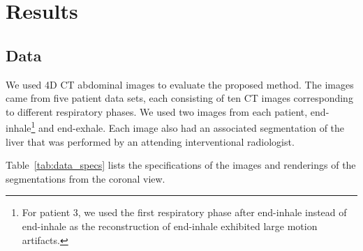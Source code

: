 \documentclass[]{spie}  %
\begin{document}
\section{Results}

\subsection{Data}

We used 4D CT abdominal images to evaluate the proposed method. The images came from five patient data sets, each consisting of ten CT images corresponding to different respiratory phases. We used two images from each patient, end-inhale\footnote{For patient 3, we used the first respiratory phase after end-inhale instead of end-inhale as the reconstruction of end-inhale exhibited large motion artifacts.} and end-exhale. Each image also had an associated segmentation of the liver that was performed by an attending interventional radiologist.

Table~\ref{tab:data_specs} lists the specifications of the images and renderings of the segmentations from the coronal view.
\end{document}
